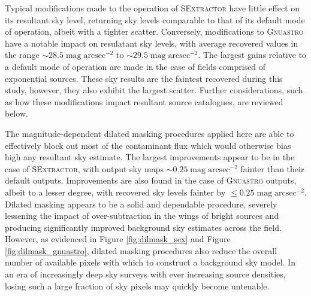 \documentclass[fleqn,usenatbib,useAMS]{mnras}
\newcommand*{\about}{\mathord\sim}
\newcommand*{\SExtractor}{\textsc{SExtractor}\xspace}
\newcommand*{\Gnuastro}{\textsc{Gnuastro}\xspace}
\begin{document}
Typical modifications made to the operation of \SExtractor have little effect on its resultant sky level, returning sky levels comparable to that of its default mode of operation, albeit with a tighter scatter. Conversely, modifications to \Gnuastro have a notable impact on resulatant sky levels, with average recovered values in the range $\about28.5\;\mathrm{mag\;arcsec}^{-2}$ to $\about29.5\;\mathrm{mag\;arcsec}^{-2}$. The largest gains relative to a default mode of operation are made in the case of fields comprised of exponential sources. These sky results are the faintest recovered during this study, however, they also exhibit the largest scatter. Further considerations, such as how these modifications impact resultant source catalogues, are reviewed below. 

The magnitude-dependent dilated masking procedures applied here are able to effectively block out most of the contaminant flux which would otherwise bias high any resultant sky estimate. The largest improvements appear to be in the case of \SExtractor, with output sky maps $\about0.25\;\mathrm{mag\;arcsec}^{-2}$ fainter than their default outputs. Improvements are also found in the case of \Gnuastro outputs, albeit to a lesser degree, with recovered sky levels fainter by $\le0.25\;\mathrm{mag\;arcsec}^{-2}$. Dilated masking appears to be a solid and dependable procedure, severely lessening the impact of over-subtraction in the wings of bright sources and producing significantly improved background sky estimates across the field. However, as evidenced in Figure \ref{fig:dilmask_sex} and Figure \ref{fig:dilmask_gnuastro}, dilated masking procedures also reduce the overall number of available pixels with which to construct a background sky model. In an era of increasingly deep sky surveys with ever increasing source densities, losing such a large fraction of sky pixels may quickly become untenable. 
\end{document}
